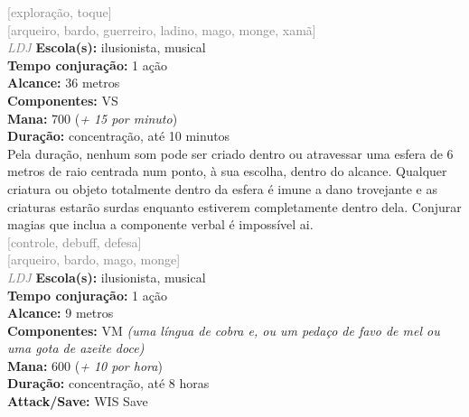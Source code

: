 \documentclass{RPG_Adventure}[2021/10/20]
\begin{document}
{\scriptsize \textcolor{gray}{[exploração, toque]\\}}
{\scriptsize \textcolor{gray}{[arqueiro, bardo, guerreiro, ladino, mago, monge, xamã]\\}}
{\tiny \textcolor{gray}{\textit{LDJ}}}\jump{}
{\small \t \textbf{Escola(s):} ilusionista, musical\\\t \textbf{Tempo conjuração:} 1 ação\\\t \textbf{Alcance:} 36 metros\\\t \textbf{Componentes:} VS\\\t \textbf{Mana:} 700 (\textit{+ 15 por minuto})\\\t \textbf{Duração:} concentração, até 10 minutos\\}
{\normalsize Pela duração, nenhum som pode ser criado dentro ou atravessar uma esfera de 6 metros de raio centrada num ponto, à sua escolha, dentro do alcance. Qualquer criatura ou objeto totalmente dentro da esfera é imune a dano trovejante e as criaturas estarão surdas enquanto estiverem completamente dentro dela. Conjurar magias que inclua a componente verbal é impossível ai.\\}
{\scriptsize \textcolor{gray}{[controle, debuff, defesa]\\}}
{\scriptsize \textcolor{gray}{[arqueiro, bardo, mago, monge]\\}}
{\tiny \textcolor{gray}{\textit{LDJ}}}\jump{}
{\small \t \textbf{Escola(s):} ilusionista, musical\\\t \textbf{Tempo conjuração:} 1 ação\\\t \textbf{Alcance:} 9 metros\\\t \textbf{Componentes:} VM \textit{(uma língua de cobra e, ou um pedaço de favo de mel ou uma gota de azeite doce)}\\\t \textbf{Mana:} 600 (\textit{+ 10 por hora})\\\t \textbf{Duração:} concentração, até 8 horas\\\t \textbf{Attack/Save:} WIS Save\\}
\end{document}
